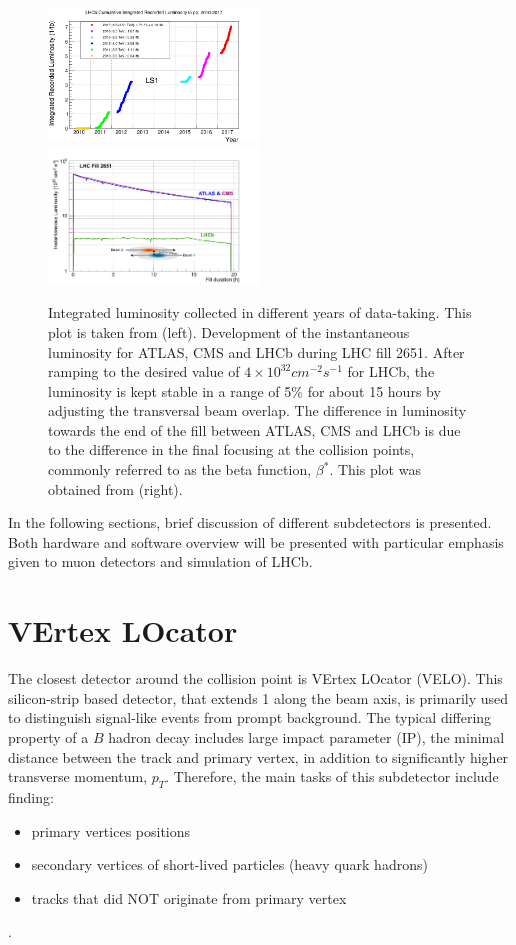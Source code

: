 \begin{figure}
	\centering
	\includegraphics[width = 0.5\textwidth]{figs/detector/intlumi.png}%
        \includegraphics[width = 0.5\textwidth]{figs/detector/lumicompare.png}
	\caption{Integrated luminosity collected in different years of data-taking. This plot is taken from \cite{lumiover} (left). Development of the instantaneous luminosity for \Gls{ATLAS}, \Gls{CMS} and \Gls{LHCb} during LHC fill 2651. After ramping to the desired value of $4\times10^{32}cm^{-2}s^{-1}$
for LHCb, the luminosity is kept stable in a range of 5$\%$ for about 15 hours by adjusting the transversal beam overlap. The difference in luminosity towards the end of the fill between ATLAS, \Gls{CMS} and \Gls{LHCb} is due to the difference in the final focusing at the collision points, commonly referred to as the beta function, $\beta^{*}$. This plot was obtained from \cite{LHCb-DP-2014-002} (right).}
	\label{fig:lhcbintlumi}
\end{figure}

In the following sections, brief discussion of different subdetectors is presented. Both hardware and software overview will be presented with particular emphasis given to muon detectors and simulation of \gls{LHCb}.

\section{VErtex LOcator }
The closest detector around the collision point is VErtex LOcator (\Gls{VELO}). This silicon-strip based detector, that extends 1 \m along the beam axis, is primarily used to distinguish signal-like events from prompt background. The typical differing property of a $B$ hadron decay includes large impact parameter (\Gls{IP}), the minimal distance between the track and primary vertex, in addition to significantly higher transverse momentum, $p_{T}$. Therefore, the main tasks of this subdetector include finding: 
\begin{itemize}
\item primary vertices positions
\item secondary vertices of short-lived particles (heavy quark hadrons)
\item tracks that did NOT originate from primary vertex
\end{itemize}.


